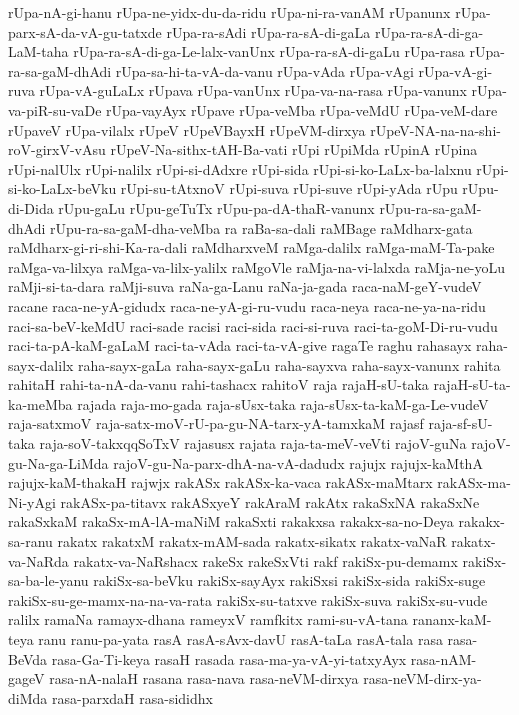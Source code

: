{rUpa-nA-gi-hanu
rUpa-ne-yidx-du-da-ridu
rUpa-ni-ra-vanAM
rUpanunx
rUpa-parx-sA-da-vA-gu-tatxde
rUpa-ra-sAdi
rUpa-ra-sA-di-gaLa
rUpa-ra-sA-di-ga-LaM-taha
rUpa-ra-sA-di-ga-Le-lalx-vanUnx
rUpa-ra-sA-di-gaLu
rUpa-rasa
rUpa-ra-sa-gaM-dhAdi
rUpa-sa-hi-ta-vA-da-vanu
rUpa-vAda
rUpa-vAgi
rUpa-vA-gi-ruva
rUpa-vA-guLaLx
rUpava
rUpa-vanUnx
rUpa-va-na-rasa
rUpa-vanunx
rUpa-va-piR-su-vaDe
rUpa-vayAyx
rUpave
rUpa-veMba
rUpa-veMdU
rUpa-veM-dare
rUpaveV
rUpa-vilalx
rUpeV
rUpeVBayxH
rUpeVM-dirxya
rUpeV-NA-na-na-shi-roV-girxV-vAsu
rUpeV-Na-sithx-tAH-Ba-vati
rUpi
rUpiMda
rUpinA
rUpina
rUpi-nalUlx
rUpi-nalilx
rUpi-si-dAdxre
rUpi-sida
rUpi-si-ko-LaLx-ba-lalxnu
rUpi-si-ko-LaLx-beVku
rUpi-su-tAtxnoV
rUpi-suva
rUpi-suve
rUpi-yAda
rUpu
rUpu-di-Dida
rUpu-gaLu
rUpu-geTuTx
rUpu-pa-dA-thaR-vanunx
rUpu-ra-sa-gaM-dhAdi
rUpu-ra-sa-gaM-dha-veMba
ra
raBa-sa-dali
raMBage
raMdharx-gata
raMdharx-gi-ri-shi-Ka-ra-dali
raMdharxveM
raMga-dalilx
raMga-maM-Ta-pake
raMga-va-lilxya
raMga-va-lilx-yalilx
raMgoVle
raMja-na-vi-lalxda
raMja-ne-yoLu
raMji-si-ta-dara
raMji-suva
raNa-ga-Lanu
raNa-ja-gada
raca-naM-geY-vudeV
racane
raca-ne-yA-gidudx
raca-ne-yA-gi-ru-vudu
raca-neya
raca-ne-ya-na-ridu
raci-sa-beV-keMdU
raci-sade
racisi
raci-sida
raci-si-ruva
raci-ta-goM-Di-ru-vudu
raci-ta-pA-kaM-gaLaM
raci-ta-vAda
raci-ta-vA-give
ragaTe
raghu
rahasayx
raha-sayx-dalilx
raha-sayx-gaLa
raha-sayx-gaLu
raha-sayxva
raha-sayx-vanunx
rahita
rahitaH
rahi-ta-nA-da-vanu
rahi-tashacx
rahitoV
raja
rajaH-sU-taka
rajaH-sU-ta-ka-meMba
rajada
raja-mo-gada
raja-sUsx-taka
raja-sUsx-ta-kaM-ga-Le-vudeV
raja-satxmoV
raja-satx-moV-rU-pa-gu-NA-tarx-yA-tamxkaM
rajasf
raja-sf-sU-taka
raja-soV-takxqqSoTxV
rajasusx
rajata
raja-ta-meV-veVti
rajoV-guNa
rajoV-gu-Na-ga-LiMda
rajoV-gu-Na-parx-dhA-na-vA-dadudx
rajujx
rajujx-kaMthA
rajujx-kaM-thakaH
rajwjx
rakASx
rakASx-ka-vaca
rakASx-maMtarx
rakASx-ma-Ni-yAgi
rakASx-pa-titavx
rakASxyeY
rakAraM
rakAtx
rakaSxNA
rakaSxNe
rakaSxkaM
rakaSx-mA-lA-maNiM
rakaSxti
rakakxsa
rakakx-sa-no-Deya
rakakx-sa-ranu
rakatx
rakatxM
rakatx-mAM-sada
rakatx-sikatx
rakatx-vaNaR
rakatx-va-NaRda
rakatx-va-NaRshacx
rakeSx
rakeSxVti
rakf
rakiSx-pu-demamx
rakiSx-sa-ba-le-yanu
rakiSx-sa-beVku
rakiSx-sayAyx
rakiSxsi
rakiSx-sida
rakiSx-suge
rakiSx-su-ge-mamx-na-na-va-rata
rakiSx-su-tatxve
rakiSx-suva
rakiSx-su-vude
ralilx
ramaNa
ramayx-dhana
rameyxV
ramfkitx
rami-su-vA-tana
rananx-kaM-teya
ranu
ranu-pa-yata
rasA
rasA-sAvx-davU
rasA-taLa
rasA-tala
rasa
rasa-BeVda
rasa-Ga-Ti-keya
rasaH
rasada
rasa-ma-ya-vA-yi-tatxyAyx
rasa-nAM-gageV
rasa-nA-nalaH
rasana
rasa-nava
rasa-neVM-dirxya
rasa-neVM-dirx-ya-diMda
rasa-parxdaH
rasa-sididhx
}
